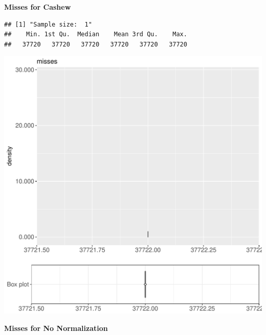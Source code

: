 \documentclass{article}\usepackage[]{graphicx}\usepackage[]{color}
\makeatletter
\def\maxwidth{ %
  \ifdim\Gin@nat@width>\linewidth
    \linewidth
  \else
    \Gin@nat@width
  \fi
}
\newenvironment{kframe}{%
 \def\at@end@of@kframe{}%
 \ifinner\ifhmode%
  \def\at@end@of@kframe{\end{minipage}}%
  \begin{minipage}{\columnwidth}%
 \fi\fi%
 \def\FrameCommand##1{\hskip\@totalleftmargin \hskip-\fboxsep
 \colorbox{shadecolor}{##1}\hskip-\fboxsep
     \hskip-\linewidth \hskip-\@totalleftmargin \hskip\columnwidth}%
 \MakeFramed {\advance\hsize-\width
   \@totalleftmargin\z@ \linewidth\hsize
   \@setminipage}}%
 {\par\unskip\endMakeFramed%
 \at@end@of@kframe}
\newenvironment{knitrout}{}{} %
\makeatother
\begin{document}
 \textbf{Misses for Cashew}
\begin{knitrout}
\color{fgcolor}\begin{kframe}
\begin{verbatim}
## [1] "Sample size:  1"
##    Min. 1st Qu.  Median    Mean 3rd Qu.    Max. 
##   37720   37720   37720   37720   37720   37720
\end{verbatim}


{\ttfamily\noindent\bfseries{}}\end{kframe}
\includegraphics[width=\maxwidth]{figure/RH4_cashew_crime-1} 

\end{knitrout}
 \textbf{Misses for No Normalization}
\end{document}

